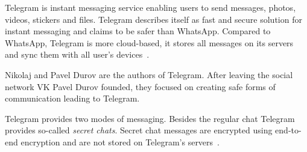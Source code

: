 \documentclass[thesis=M,english]{FITthesis}[2012/10/20]
\begin{document}
Telegram is instant messaging service enabling users to send messages, photos, videos, stickers and files. Telegram describes itself as fast and secure solution for instant messaging and claims to be safer than WhatsApp. Compared to WhatsApp, Telegram is more cloud-based, it stores all messages on its servers and sync them with all user's devices~\cite{telegramfaq}.

Nikolaj and Pavel Durov are the authors of Telegram. After leaving the  social network VK Pavel Durov founded, they focused on creating safe forms of communication leading to Telegram.

Telegram provides two modes of messaging. Besides the regular chat Telegram provides so-called \emph{secret chats}. Secret chat messages are encrypted using end-to-end encryption and are not stored on Telegram's servers~\cite{telegramfaq}.
\end{document}
